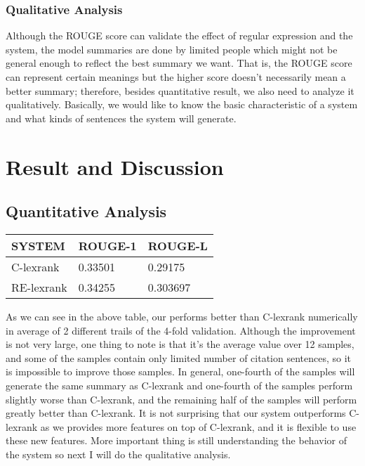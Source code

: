 \documentclass[hyp]{socreport}
\begin{document}
\subsubsection{Qualitative Analysis}

Although the ROUGE score can validate the effect of regular expression and the system, the model summaries are done by limited people which might not be general enough to reflect the best summary we want. That is, the ROUGE score can represent certain meanings but the higher score doesn’t necessarily mean a better summary; therefore, besides quantitative result, we also need to analyze it qualitatively. Basically, we would like to know the basic characteristic of a system and what kinds of sentences the system will generate.  
 

\section{Result and Discussion}


\subsection{ Quantitative Analysis}
 


\begin{tabular}[t]{lll}
\hline
SYSTEM & ROUGE-1 & ROUGE-L \\
\hline
C-lexrank & 0.33501 & 0.29175 \\
RE-lexrank & 0.34255 & 0.303697 \\
\hline
\end{tabular}

As we can see in the above table, our  performs better than C-lexrank numerically in average of 2 different trails of the 4-fold validation. Although the improvement is not very large, one thing to note is that it’s the average value over 12 samples, and some of the samples contain only limited number of citation sentences, so it is impossible to improve those samples. In general, one-fourth of the samples will generate the same summary as C-lexrank and one-fourth of the samples perform slightly worse than C-lexrank, and the remaining half of the samples will perform greatly better than C-lexrank. It is not surprising that our system outperforms C-lexrank as we provides more features on top of C-lexrank, and it is flexible to use these new features. More important thing is still understanding the behavior of the system so next I will do the qualitative analysis.
\end{document}
